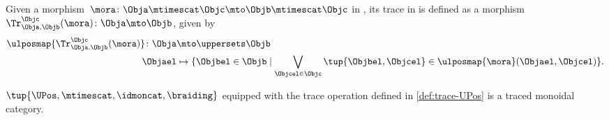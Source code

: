 \begin{definition}
    \label{def:trace-UPos}
    Given a morphism~$\mora\colon \Obja \mtimescat \Objc \mto \Objb\mtimescat \Objc$ in \UPos, its trace in is defined as a morphism~$\Tr_{\Obja,\Objb}^{\Objc}(\mora)\colon \Obja \mto \Objb$, given by
    \begin{equation}
        \begin{aligned}
            \ulposmap{\Tr_{\Obja,\Objb}^{\Objc}(\mora)}\colon \Obja &\mto \uppersets \Objb\\
            \Objael & \mapsto \{\Objbel \in \Objb \mid \bigvee_{\Objcel \in \Objc}\tup{\Objbel, \Objcel}\in \ulposmap{\mora}(\Objael,\Objcel)\}.
        \end{aligned}
    \end{equation}
\end{definition}
\begin{lemma}
    \label{lem:UPos-is-traced}
    $\tup{\UPos,\mtimescat, \idmoncat,\braiding}$ equipped with the trace operation defined in \cref{def:trace-UPos} is a traced monoidal category.
\end{lemma}
